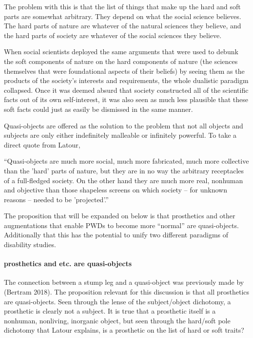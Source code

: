 \documentclass{lps}
\begin{document}
The problem with this is that the list of things that make up the hard and
soft parts are somewhat arbitrary. They depend on what the social science
believes. The hard parts of nature are whatever of the natural sciences they
believe, and the hard parts of society are whatever of the social sciences
they believe. 

When social scientists deployed the same arguments that were used to debunk
the soft components of nature on the hard components of nature (the sciences
themselves that were foundational aspects of their beliefs) by seeing them as
the products of the society's interests and requirements, the whole dualistic
paradigm collapsed. Once it was deemed absurd that society constructed all of
the scientific facts out of its own self-interest, it was also seen as much
less plausible that these soft facts could just as easily be dismissed in the
same manner.

Quasi-objects are offered as the solution to the problem that not all objects
and subjects are only either indefinitely malleable or infinitely powerful. To
take a direct quote from Latour,

``Quasi-objects are much more social, much more fabricated, much more
collective than the 'hard' parts of nature, but they are in no way the
arbitrary receptacles of a full-fledged society. On the other hand they are
much more real, nonhuman and objective than those shapeless screens on which
society – for unknown reasons – needed to be 'projected'.''

The proposition that will be expanded on below is that prosthetics and other
augmentations that enable PWDs to become more ``normal'' are quasi-objects.
Additionally that this has the potential to unify two different paradigms of
disability studies. 

\paragraph{prosthetics and etc. are quasi-objects}

The connection between a stump leg and a quasi-object was previously made by
(Bertram 2018). The proposition relevant for this discussion is that all
prosthetics are quasi-objects. Seen through the lense of the subject/object
dichotomy, a prosthetic is clearly not a subject. It is true that a prosthetic
itself is a nonhuman, nonliving, inorganic object, but seen through the
hard/soft pole dichotomy that Latour explains, is a prosthetic on the list of
hard or soft traits? 
\end{document}
